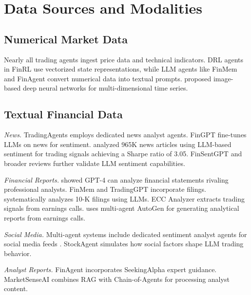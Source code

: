 \documentclass[12pt]{report}
\begin{document}
\chapter{Data Sources and Modalities}

\section{Numerical Market Data}

Nearly all trading agents ingest price data and technical indicators. DRL agents in FinRL \citep{liu2020finrl} use vectorized state representations, while LLM agents like FinMem \citep{yu2023finmem} and FinAgent \citep{zhang2024finagent} convert numerical data into textual prompts. \citet{huang2024drlportfolio} proposed image-based deep neural networks for multi-dimensional time series.

\section{Textual Financial Data}

\textit{News.} TradingAgents \citep{xiao2024tradingagents} employs dedicated news analyst agents. FinGPT \citep{yang2023fingpt} fine-tunes LLMs on news for sentiment. \citet{kirtac2024sentiment} analyzed 965K news articles using LLM-based sentiment for trading signals achieving a Sharpe ratio of 3.05. FinSentGPT \citep{finsentgpt2024} and broader reviews \citep{llmsentiment2024} further validate LLM sentiment capabilities.

\textit{Financial Reports.} \citet{kim2024financial} showed GPT-4 can analyze financial statements rivaling professional analysts. FinMem \citep{yu2023finmem} and TradingGPT \citep{li2023tradinggpt} incorporate filings. \citet{daimi2024sec10k} systematically analyzes 10-K filings using LLMs. ECC Analyzer \citep{ecc2024analyzer} extracts trading signals from earnings calls. \citet{earningscalls2024} uses multi-agent AutoGen for generating analytical reports from earnings calls.

\textit{Social Media.} Multi-agent systems include dedicated sentiment analyst agents for social media feeds \citep{xiao2024tradingagents}. StockAgent \citep{zhang2024stockagent} simulates how social factors shape LLM trading behavior.

\textit{Analyst Reports.} FinAgent \citep{zhang2024finagent} incorporates SeekingAlpha expert guidance. MarketSenseAI \citep{fatouros2025marketsenseai} combines RAG with Chain-of-Agents for processing analyst content.
\end{document}
